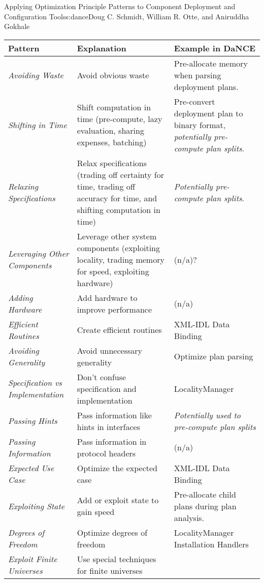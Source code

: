 \begin{aosachapter}{Applying Optimization Principle Patterns to Component Deployment and
                    Configuration Tools}{s:dance}{Doug C. Schmidt, William R. Otte, and Aniruddha Gokhale}
\begin{table}
\centering
{\footnotesize
{}
\begin{tabular}{p{2.5cm} p{3.5cm} p{5.4cm}}
\hline
Pattern
& Explanation
& Example in DaNCE
\\
\hline
\emph{Avoiding Waste}
& Avoid obvious waste
& Pre-allocate memory when parsing deployment plans.
\\
\emph{Shifting in Time}
& Shift computation in time (pre-compute, lazy evaluation, sharing expenses, batching)
& Pre-convert deployment plan to binary format, \newline
\emph{potentially pre-compute plan splits}.
\\
\emph{Relaxing \newline Specifications}
& Relax specifications (trading off certainty for time, trading off accuracy for time, and shifting computation in time)
& \emph{Potentially pre-compute plan splits}.
\\
\emph{Leveraging Other \newline Components}
& Leverage other system components (exploiting locality, trading memory for speed, exploiting hardware)
& (n/a)?
\\
\emph{Adding Hardware}
& Add hardware to improve performance
& (n/a)
\\
\emph{Efficient Routines}
& Create efficient routines
& XML-IDL Data Binding
\\
\emph{Avoiding Generality}
& Avoid unnecessary generality
& Optimize plan parsing
\\
\emph{Specification vs \newline Implementation}
& Don't confuse specification and implementation
& LocalityManager
\\
\emph{Passing Hints}
& Pass information like hints in interfaces
& \emph{Potentially used to pre-compute plan splits}
\\
\emph{Passing Information}
& Pass information in protocol headers
& (n/a)
\\
\emph{Expected Use Case}
& Optimize the expected case
& XML-IDL Data Binding
\\
\emph{Exploiting State}
& Add or exploit state to gain speed
& Pre-allocate child plans during plan analysis.
\\
\emph{Degrees of Freedom}
& Optimize degrees of freedom
& LocalityManager Installation Handlers
\\
\emph{Exploit Finite \newline Universes}
& Use special techniques for finite universes

\end{tabular}}
\end{table}
\end{aosachapter}
